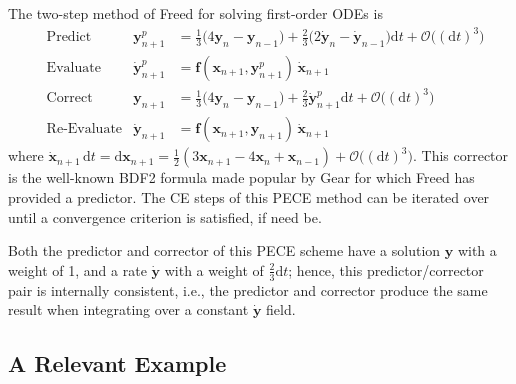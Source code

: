 The two-step method of Freed \cite{Freed17a} for solving first-order ODEs is
\begin{subequations}
    \label{1stOrderODEs}
    \begin{align}
    \mbox{} & \text{Predict} & 
    \mathbf{y}_{n+1}^p & = \tfrac{1}{3} 
    \bigl( 4 \mathbf{y}_n - \mathbf{y}_{n-1} \bigr) + 
    \tfrac{2}{3} \bigl( 2 \dot{\mathbf{y}}_n - \dot{\mathbf{y}}_{n-1} 
    \bigr) \mathrm{d}t + \mathcal{O} \bigl( (\mathrm{d}t)^3 \bigr)
    \label{1stOrderPredictor} \\
    \mbox{} & \text{Evaluate} & 
    \dot{\mathbf{y}}^p_{n+1} & = \mathbf{f} (\mathbf{x}_{n+1} , \mathbf{y}_{n+1}^p) \, \dot{\mathbf{x}}_{n+1}
    \label{1stOrderEvaluate} \\
    \mbox{} & \text{Correct} &
    \mathbf{y}_{n+1} & = \tfrac{1}{3} 
    \bigl( 4 \mathbf{y}_n - \mathbf{y}_{n-1} \bigr) + 
    \tfrac{2}{3} \dot{\mathbf{y}}^{p}_{n+1} \mathrm{d}t + 
    \mathcal{O} \bigl( (\mathrm{d}t)^3 \bigr)
    \label{1stOrderCorrector} \\
    \mbox{} & \text{Re-Evaluate} & 
    \dot{\mathbf{y}}_{n+1} & = \mathbf{f} (\mathbf{x}_{n+1} , \mathbf{y}_{n+1}) \, 
    \dot{\mathbf{x}}_{n+1}
    \label{1stOrderReEvaluate}
    \end{align}
\end{subequations} 
where $\dot{\mathbf{x}}_{n+1} \, \mathrm{d}t = \mathrm{d} \mathbf{x}_{n+1} = \tfrac{1}{2} ( 3 \mathbf{x}_{n+1} - 4 \mathbf{x}_n + \mathbf{x}_{n-1} ) + \mathcal{O}\bigl( (\mathrm{d}t)^3 \bigr)$.  This corrector is the well-known BDF2 formula made popular by Gear for which Freed has provided a predictor.  The CE steps of this PECE method can be iterated over until a convergence criterion is satisfied, if need be. 

Both the predictor and corrector of this PECE scheme have a solution $\mathbf{y}$ with a weight of 1, and a rate $\dot{\mathbf{y}}$ with a weight of $\tfrac{2}{3} \mathrm{d}t$; hence, this predictor\slash corrector pair is internally consistent, i.e., the predictor and corrector produce the same result when integrating over a constant $\dot{\mathbf{y}}$ field.

\subsection{A Relevant Example}

